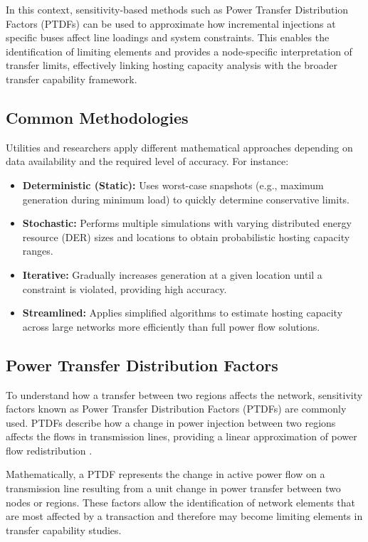 In this context, sensitivity-based methods such as Power Transfer Distribution Factors (PTDFs) can be used to approximate how incremental injections at specific buses affect line loadings and system constraints. This enables the identification of limiting elements and provides a node-specific interpretation of transfer limits, effectively linking hosting capacity analysis with the broader transfer capability framework.

\subsection{Common Methodologies}

Utilities and researchers apply different mathematical approaches depending on data availability and the required level of accuracy. For instance:

\begin{itemize}
    \item \textbf{Deterministic (Static):} Uses worst-case snapshots (e.g., maximum generation during minimum load) to quickly determine conservative limits.
    \item \textbf{Stochastic:} Performs multiple simulations with varying distributed energy resource (DER) sizes and locations to obtain probabilistic hosting capacity ranges.
    \item \textbf{Iterative:} Gradually increases generation at a given location until a constraint is violated, providing high accuracy.
    \item \textbf{Streamlined:} Applies simplified algorithms to estimate hosting capacity across large networks more efficiently than full power flow solutions.
\end{itemize}


\subsection{Power Transfer Distribution Factors}

To understand how a transfer between two regions affects the network, sensitivity factors known as Power Transfer Distribution Factors (PTDFs) are commonly used. PTDFs describe how a change in power injection between two regions affects the flows in transmission lines, providing a linear approximation of power flow redistribution \cite{wood2013power,stott2009dc}.

Mathematically, a PTDF represents the change in active power flow on a transmission line resulting from a unit change in power transfer between two nodes or regions. These factors allow the identification of network elements that are most affected by a transaction and therefore may become limiting elements in transfer capability studies.

